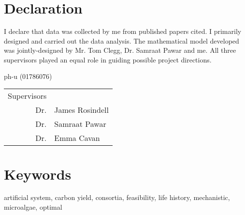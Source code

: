 \documentclass[../thesis.tex]{subfiles} %
\begin{document}
\maketitle\clearpage

\section*{Declaration}
I declare that data was collected by me from published papers cited.  I primarily designed and carried out the data analysis.  The mathematical model developed was jointly-designed by Mr. Tom Clegg, Dr. Samraat Pawar and me.  All three supervisors played an equal role in guiding possible project directions.

\begin{flushright}
ph-u (01786076)

\begin{tabular}{rl}
    Supervisors & \\
    Dr. & James Rosindell \\
    Dr. & Samraat Pawar \\
    Dr. & Emma Cavan
\end{tabular}
\end{flushright}

\tableofcontents
\listoffigures
\listoftables

\section*{Keywords}
artificial system,
carbon yield,
consortia,
feasibility,
life history,
mechanistic,
microalgae,
optimal
\end{document}
